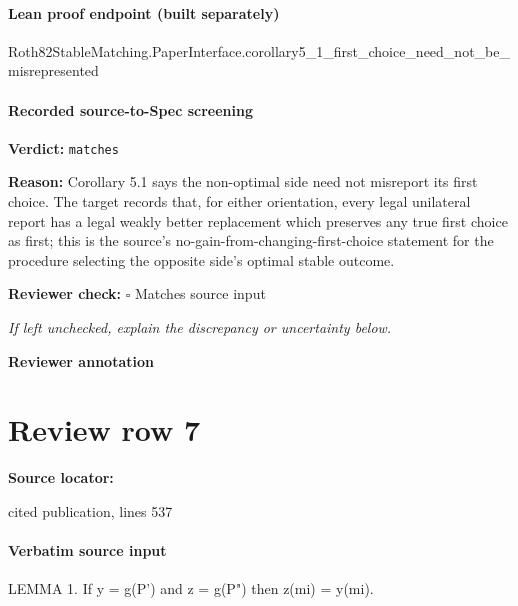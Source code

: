 \documentclass[10pt]{article}
\newcommand{\reviewerbox}{%
  \par\noindent\fbox{\parbox{0.96\linewidth}{\rule{0pt}{0.38in}}}\par
}
\newcommand{\reviewmatch}[1]{%
  \par\noindent\textbf{Reviewer check:} $\square$\; #1\par
  \noindent\emph{If left unchecked, explain the discrepancy or uncertainty below.}\par
}
\begin{document}
\paragraph{Lean proof endpoint (built separately)}\begin{ReviewVerbatim}
Roth82StableMatching.PaperInterface.corollary5_1_first_choice_need_not_be_misrepresented
\end{ReviewVerbatim}

\paragraph{Recorded source-to-Spec screening}
\textbf{Verdict:} \texttt{matches}
\\
{\raggedright
\textbf{Reason:} Corollary 5.\allowbreak{}1 says the non-\allowbreak{}optimal side need not misreport its first choice.\allowbreak{}  The target records that, for either orientation, every legal unilateral report has a legal weakly better replacement which preserves any true first choice as first;\allowbreak{} this is the source's no-\allowbreak{}gain-\allowbreak{}from-\allowbreak{}changing-\allowbreak{}first-\allowbreak{}choice statement for the procedure selecting the opposite side's optimal stable outcome.\allowbreak{}
\par}
\reviewmatch{Matches source input}
\noindent\textbf{Reviewer annotation}\par
\reviewerbox
\clearpage
\hypertarget{source-claim-f2c197ac0692ce06}{}
\section*{Review row 7}
\textbf{Source locator:} {\footnotesize\raggedright cited publication, lines 537\par}
\paragraph{Verbatim source input}
\begin{ReviewVerbatim}
LEMMA 1. If y = g(P') and z = g(P") then z(mi) = y(mi).
\end{ReviewVerbatim}
\end{document}
